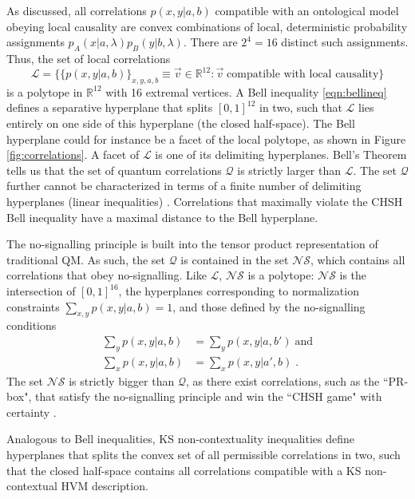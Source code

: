 As discussed, all correlations $p(x,y\vert a,b)$ compatible with an ontological model obeying local causality are convex combinations of local, deterministic probability assignments $p_A(x \vert a,\lambda)p_B(y \vert b,\lambda)$. There are $2^4=16$ distinct such assignments. Thus, the set of local correlations 
\begin{equation*}
\mathcal{L} =\{\{p(x,y\vert a,b)\}_{x,y,a,b}\equiv \vec{v}\in\mathbb{R}^{12}: \vec{v}\; \text{compatible with local causality}\}
\end{equation*}
is a polytope in $\mathbb{R}^{12}$ with 16 extremal vertices. A Bell inequality \ref{eqn:bellineq} defines a separative hyperplane that splits $[0,1]^{12}$ in two, such that $\mathcal{L}$ lies entirely on one side of this hyperplane (the closed half-space). The Bell hyperplane could for instance be a facet of the local polytope, as shown in Figure \ref{fig:correlations}. A facet of $\mathcal{L}$ is one of its delimiting hyperplanes. Bell's Theorem tells us that the set of quantum correlations $\mathcal{Q}$ is strictly larger than $\mathcal{L}$. The set $\mathcal{Q}$ further cannot be characterized in terms of a finite number of delimiting hyperplanes (linear inequalities) \cite{Brunner2014}. Correlations that maximally violate the CHSH Bell inequality have a maximal distance to the Bell hyperplane.

The no-signalling principle is built into the tensor product representation of traditional QM. As such, the set $\mathcal{Q}$ is contained in the set $\mathcal{NS}$, which contains all correlations that obey no-signalling. Like $\mathcal{L}$, $\mathcal{NS}$ is a polytope: $\mathcal{NS}$ is the intersection of $[0,1]^{16}$, the hyperplanes corresponding to normalization constraints $\sum_{x,y} p(x,y\vert a,b)=1$, and those defined by the no-signalling conditions
\begin{align*}
\sum_y p(x,y\vert a,b) & = \sum_y p(x,y\vert a,b') \; \text{and} \\
\sum_x p(x,y\vert a,b) & = \sum_x p(x,y\vert a',b)\;.
\end{align*}
The set $\mathcal{NS}$ is strictly bigger than $\mathcal{Q}$, as there exist correlations, such as the ``PR-box", that satisfy the no-signalling principle and win the ``CHSH game" with certainty \cite{Brunner2014}.

Analogous to Bell inequalities, KS non-contextuality inequalities define hyperplanes that splits the convex set of all permissible correlations in two, such that the closed half-space contains all correlations compatible with a KS non-contextual HVM description.

